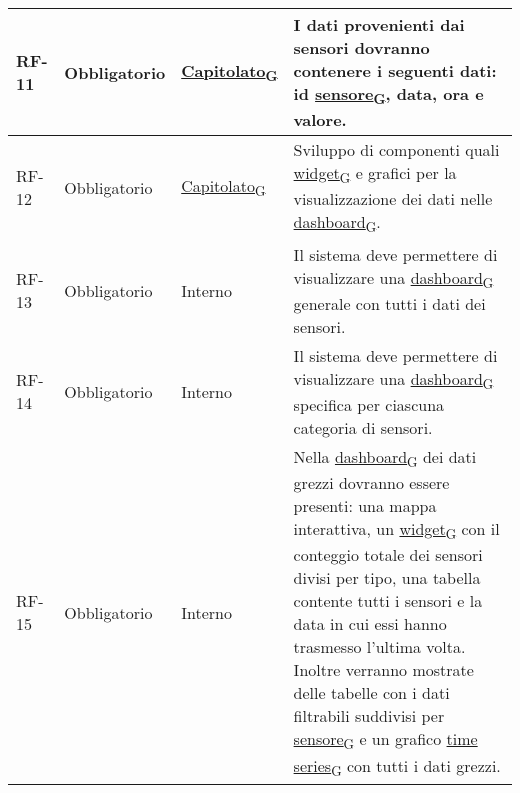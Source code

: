 \begin{longtable}{|>{\centering\arraybackslash}m{}|>{\centering\arraybackslash}m{}|>{\centering\arraybackslash}m{}|>{\centering\arraybackslash}m{}|}
	\\\hline
	RF-11           & Obbligatorio        & \href{https://7last.github.io/docs/rtb/documentazione-interna/glossario\#capitolato}{Capitolato\textsubscript{G}} & I dati provenienti dai sensori dovranno contenere i seguenti dati: id \href{https://7last.github.io/docs/rtb/documentazione-interna/glossario\#sensore}{sensore\textsubscript{G}}, data, ora e valore.
	\\\hline
	RF-12           & Obbligatorio        & \href{https://7last.github.io/docs/rtb/documentazione-interna/glossario\#capitolato}{Capitolato\textsubscript{G}} & Sviluppo di componenti quali \href{https://7last.github.io/docs/rtb/documentazione-interna/glossario\#widget}{widget\textsubscript{G}} e grafici per la visualizzazione dei dati nelle \href{https://7last.github.io/docs/rtb/documentazione-interna/glossario\#dashboard}{dashboard\textsubscript{G}}.
	\\\hline
	RF-13           & Obbligatorio        & Interno                                                                                                           & Il sistema deve permettere di visualizzare una \href{https://7last.github.io/docs/rtb/documentazione-interna/glossario\#dashboard}{dashboard\textsubscript{G}} generale con tutti i dati dei sensori.
	\\\hline
	RF-14           & Obbligatorio        & Interno                                                                                                           & Il sistema deve permettere di visualizzare una \href{https://7last.github.io/docs/rtb/documentazione-interna/glossario\#dashboard}{dashboard\textsubscript{G}} specifica per ciascuna categoria di sensori.
	\\\hline
	RF-15           & Obbligatorio        & Interno                                                                                                           & Nella \href{https://7last.github.io/docs/rtb/documentazione-interna/glossario\#dashboard}{dashboard\textsubscript{G}} dei dati grezzi dovranno essere presenti: una mappa interattiva, un \href{https://7last.github.io/docs/rtb/documentazione-interna/glossario\#widget}{widget\textsubscript{G}} con il conteggio totale dei sensori divisi per tipo, una tabella contente tutti i sensori e la data in cui essi hanno trasmesso l'ultima volta. Inoltre verranno mostrate delle tabelle con i dati filtrabili suddivisi per \href{https://7last.github.io/docs/rtb/documentazione-interna/glossario\#sensore}{sensore\textsubscript{G}} e un grafico \href{https://7last.github.io/docs/rtb/documentazione-interna/glossario\#time-series}{time series\textsubscript{G}} con tutti i dati grezzi.

\end{longtable}
